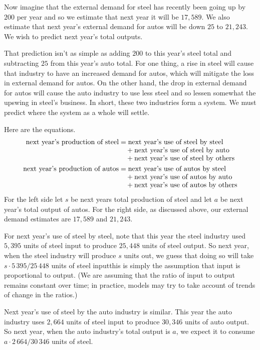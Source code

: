 Now imagine that the external demand for steel has recently been going up by
$200$ per year and so we estimate that next year it will be $17,589$.
We also estimate that next year's 
external demand for autos will be down $25$ to $21,243$.
We wish to predict next year's total outputs.

That prediction isn't as simple as adding $200$ to this year's steel
total and subtracting $25$ from this year's auto total.
For one thing, a rise in steel will cause
that industry to have an increased demand for autos, which will mitigate
the loss in external demand for autos.
On the other hand, the drop in external demand for autos will cause
the auto industry to use less steel and so lessen somewhat the
upswing in steel's business.
In short, these two industries form a system.
We must predict where the system as a whole will settle.

Here are the equations.
\begin{align*}
  \text{next year's production of steel}
     &=\text{next year's use of steel by steel}   \\[-.8ex]
     &\quad\hbox{}+\text{next year's use of steel by auto}  \\[-.8ex]  
     &\quad\hbox{}+\text{next year's use of steel by others} \\
  \text{next year's production of autos}
     &=\text{next year's use of autos by steel}   \\[-.8ex]
     &\quad\hbox{}+\text{next year's use of autos by auto}  \\[-.8ex] 
     &\quad\hbox{}+\text{next year's use of autos by others} 
\end{align*}
For the left side let
$s$ be next years total production of steel and
let $a$ be next year's total output of autos.
For the right side, as discussed above,
our external demand estimates are $17,589$ and $21,243$.

For next year's use of steel by steel, note that this year the
steel industry used $5,395$ units of steel input to produce $25,448$ units of
steel output.
So next year, when the steel industry will produce $s$ units out, 
we guess that doing so will take $s\cdot 5\,395/25\,448$
units of steel input\Dash this is simply the assumption that input is
proportional to output. 
(We are assuming that the ratio of input to output remains constant over time;
in practice, models may try to take account of trends of change in the
ratios.)

Next year's use of steel by the auto industry is similar.
This year the auto industry uses $2,664$ units of steel input to produce
$30,346$ units of auto output.
So next year, when the auto industry's total output is $a$, we expect it to 
consume $a\cdot 2\,664/30\,346$ units of steel.

